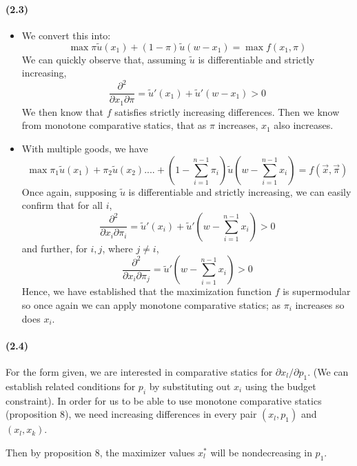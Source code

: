 \documentclass[10pt,letter]{article}
\begin{document}
\paragraph{(2.3)}
\begin{itemize}
\item We convert this into:
\[ \max \pi \tilde{u}(x_1) + (1-\pi) \tilde{u}(w - x_1) = \max f(x_1, \pi) \]
We can quickly observe that, assuming $\tilde{u}$ is differentiable and strictly increasing,
\[ \frac{\partial^2 }{\partial x_1 \partial \pi} = \tilde{u}'(x_1) + \tilde{u}'(w-x_1) > 0 \]
We then know that $f$ satisfies strictly increasing differences. Then we know from monotone comparative statics, that as $\pi$ increases, $x_1$ also increases.
\item With multiple goods, we have
\[ \max \pi_1 \tilde{u}(x_1) + \pi_2 \tilde{u}(x_2) .... + (1 - \sum_{i=1}^{n-1} \pi_i )\tilde{u} \left(w - \sum_{i=1}^{n-1} x_i \right) = f(\vec{x}, \vec{\pi}) \]
Once again, supposing $\tilde{u}$ is differentiable and strictly increasing, we can easily confirm that for all $i$,
\[ \frac{\partial^2 }{\partial x_i \partial \pi_i} = \tilde{u}'(x_i) + \tilde{u}'\left(w - \sum_{i=1}^{n-1} x_i \right) > 0  \]
and further, for $i, j$, where $j \neq i$,
\[ \frac{\partial^2 }{\partial x_i \partial \pi_j} = \tilde{u}'\left(w - \sum_{i=1}^{n-1} x_i \right) > 0 \]
Hence, we have established that the maximization function $f$ is supermodular so once again we can apply monotone comparative statics; as $\pi_i$ increases so does $x_i$.
\end{itemize}
\paragraph{(2.4)}
For the form given, we are interested in comparative statics for $\partial x_l / \partial p_1$. (We can establish related conditions for $p_i$ by substituting out $x_i$ using the budget constraint). In order for us to be able to use monotone comparative statics (proposition 8), we need increasing differences in every pair $(x_l, p_1)$ and $(x_l, x_k)$.

Then by proposition 8, the maximizer values $x_l^*$ will be nondecreasing in $p_1$.
\end{document}
